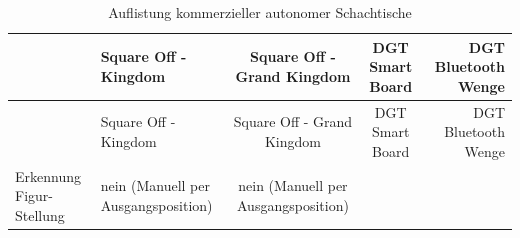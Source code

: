 \begin{longtable}[]{@{}llccr@{}}
\caption{Auflistung kommerzieller autonomer Schachtische
\label{commchesstables}}\tabularnewline
\toprule
\begin{minipage}[b]{0.19\columnwidth}\raggedright
\strut
\end{minipage} & \begin{minipage}[b]{0.19\columnwidth}\raggedright
Square Off - Kingdom \cite{squareoffkingdom}\strut
\end{minipage} & \begin{minipage}[b]{0.20\columnwidth}\centering
Square Off - Grand Kingdom \cite{squareoffgrand}\strut
\end{minipage} & \begin{minipage}[b]{0.15\columnwidth}\centering
DGT Smart Board \cite{dtgsmartboard}\strut
\end{minipage} & \begin{minipage}[b]{0.13\columnwidth}\raggedleft
DGT Bluetooth Wenge \cite{dtgble}\strut
\end{minipage}\tabularnewline
\midrule
\endfirsthead
\toprule
\begin{minipage}[b]{0.19\columnwidth}\raggedright
\strut
\end{minipage} & \begin{minipage}[b]{0.19\columnwidth}\raggedright
Square Off - Kingdom \cite{squareoffkingdom}\strut
\end{minipage} & \begin{minipage}[b]{0.20\columnwidth}\centering
Square Off - Grand Kingdom \cite{squareoffgrand}\strut
\end{minipage} & \begin{minipage}[b]{0.15\columnwidth}\centering
DGT Smart Board \cite{dtgsmartboard}\strut
\end{minipage} & \begin{minipage}[b]{0.13\columnwidth}\raggedleft
DGT Bluetooth Wenge \cite{dtgble}\strut
\end{minipage}\tabularnewline
\midrule
\endhead
\begin{minipage}[t]{0.19\columnwidth}\raggedright
Erkennung Figur-Stellung\strut
\end{minipage} & \begin{minipage}[t]{0.19\columnwidth}\raggedright
nein (Manuell per Ausgangsposition)\strut
\end{minipage} & \begin{minipage}[t]{0.20\columnwidth}\centering
nein (Manuell per Ausgangsposition)\strut

\end{minipage}
\end{longtable}
